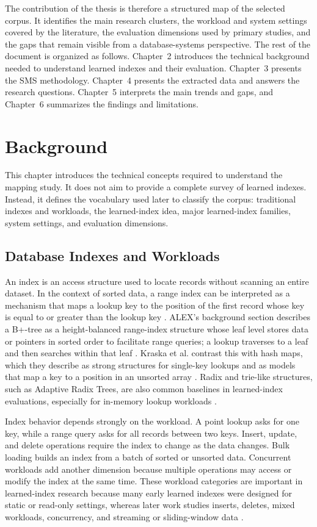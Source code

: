 \documentclass[a4paper, 12pt, twoside]{report}
\begin{document}
The contribution of the thesis is therefore a structured map of the selected corpus. It identifies the main research clusters, the workload and system settings covered by the literature, the evaluation dimensions used by primary studies, and the gaps that remain visible from a database-systems perspective. The rest of the document is organized as follows. Chapter~2 introduces the technical background needed to understand learned indexes and their evaluation. Chapter~3 presents the SMS methodology. Chapter~4 presents the extracted data and answers the research questions. Chapter~5 interprets the main trends and gaps, and Chapter~6 summarizes the findings and limitations.

\chapter{Background}

This chapter introduces the technical concepts required to understand the mapping study. It does not aim to provide a complete survey of learned indexes. Instead, it defines the vocabulary used later to classify the corpus: traditional indexes and workloads, the learned-index idea, major learned-index families, system settings, and evaluation dimensions.

\section{Database Indexes and Workloads}

An index is an access structure used to locate records without scanning an entire dataset. In the context of sorted data, a range index can be interpreted as a mechanism that maps a lookup key to the position of the first record whose key is equal to or greater than the lookup key \cite{kraska2018}. ALEX's background section describes a B+-tree as a height-balanced range-index structure whose leaf level stores data or pointers in sorted order to facilitate range queries; a lookup traverses to a leaf and then searches within that leaf \cite{ding2020alex}. Kraska et al. contrast this with hash maps, which they describe as strong structures for single-key lookups and as models that map a key to a position in an unsorted array \cite{kraska2018}. Radix and trie-like structures, such as Adaptive Radix Trees, are also common baselines in learned-index evaluations, especially for in-memory lookup workloads \cite{marcus2020benchmarking,sun2023learned}.

Index behavior depends strongly on the workload. A point lookup asks for one key, while a range query asks for all records between two keys. Insert, update, and delete operations require the index to change as the data changes. Bulk loading builds an index from a batch of sorted or unsorted data. Concurrent workloads add another dimension because multiple operations may access or modify the index at the same time. These workload categories are important in learned-index research because many early learned indexes were designed for static or read-only settings, whereas later work studies inserts, deletes, mixed workloads, concurrency, and streaming or sliding-window data \cite{ding2020alex,sun2023learned,wongkham2022ready,liang2024swix}.
\end{document}
